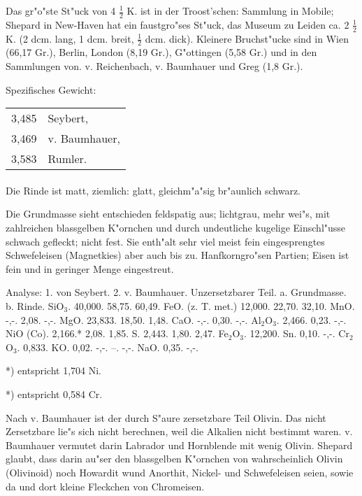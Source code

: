\documentclass[a4paper, 11pt, oneside]{article}
\begin{document}
Das gr"o"ste St"uck von 4 $\frac{1}{2}$ K. ist in der Troost'schen: Sammlung in Mobile; Shepard in New-Haven hat ein faustgro"ses St"uck, das Museum zu Leiden ca. 2 $\frac{1}{2}$ K. (2 dcm. lang, 1 dcm. breit, $\frac{1}{2}$ dcm. dick). Kleinere Bruchst"ucke sind in Wien (66,17 Gr.), Berlin, London (8,19 Gr.), G"ottingen (5,58 Gr.) und in den Sammlungen von. v. Reichenbach, v. Baumhauer und Greg (1,8 Gr.).

Spezifisches Gewicht:
\begin{table}[!ht]
    \centering
    \begin{tabular}{l l}
        3,485 & Seybert,\\
        3,469 & v. Baumhauer,\\
        3,583 & Rumler.
    \end{tabular}
\end{table}
\paragraph{}
Die Rinde ist matt, ziemlich: glatt, gleichm"a"sig br"aunlich schwarz.

Die Grundmasse sieht entschieden feldspatig aus; lichtgrau, mehr wei"s, mit zahlreichen blassgelben K"ornchen und durch undeutliche kugelige Einschl"usse schwach gefleckt; nicht fest. Sie enth"alt sehr viel meist fein eingesprengtes Schwefeleisen (Magnetkies) aber auch bis zu. Hanfkorngro"sen Partien; Eisen ist fein und in geringer Menge eingestreut.

Analyse: 1. von Seybert. 2. v. Baumhauer.  
Unzersetzbarer Teil. a. Grundmasse. b. Rinde.  
SiO$_{3}$. 40,000. 58,75. 60,49.  
FeO. (z. T. met.) 12,000. 22,70. 32,10.  
MnO. -,-. 2,08. -,-.  
MgO. 23,833. 18,50. 1,48.  
CaO. -,-. 0,30. -,-.  
Al$_{2}$O$_{3}$. 2,466. 0,23. -,-.  
NiO (Co). 2,166.* 2,08. 1,85.  
S. 2,443. 1,80. 2,47.  
Fe$_{2}$O$_{3}$. 12,200. Sn. 0,10. -,-.  
Cr$_{2}$O$_{3}$. 0,833. KO. 0,02. -,-.
--. -,-. NaO. 0,35. -,-.

*) entspricht 1,704 Ni.

*) entspricht 0,584 Cr.

Nach v. Baumhauer ist der durch S"aure zersetzbare Teil Olivin. Das nicht Zersetzbare lie"s sich nicht berechnen, weil die Alkalien nicht bestimmt waren. v. Baumhauer vermutet darin Labrador und Hornblende mit wenig Olivin. Shepard glaubt, dass darin au"ser den blassgelben K"ornchen von wahrscheinlich Olivin (Olivinoid) noch Howardit wund Anorthit, Nickel- und Schwefeleisen seien, sowie da und dort kleine Fleckchen von Chromeisen.
\end{document}
